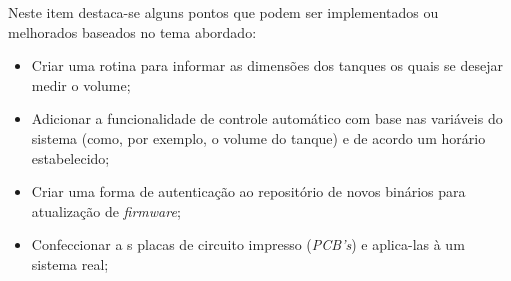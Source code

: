 Neste item destaca-se alguns pontos que podem ser implementados ou melhorados baseados no tema abordado:

\begin{itemize}
\item Criar uma rotina para informar as dimensões dos tanques os quais se desejar medir o volume;
\item Adicionar a funcionalidade de controle automático com base nas variáveis do sistema (como, por exemplo, o volume do tanque) e de acordo um horário estabelecido;
\item Criar uma forma de autenticação ao repositório de novos binários para atualização de \textit{firmware};
\item Confeccionar a
s placas de circuito impresso (\textit{PCB's}) e aplica-las à um sistema real;
\end{itemize}
